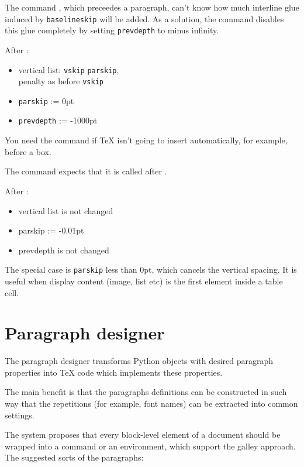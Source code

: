 \documentclass[]{ltugboat}
\begin{document}
The command , which preceedes a paragraph, can't know how much interline glue induced by \verb|baselineskip| will be added. As a solution, the command disables this glue completely by setting \verb|prevdepth| to minus infinity.

\medskip

After :

\begin{itemize}
\item vertical list: \verb|vskip| \verb|parskip|,\\penalty as before \verb|vskip|
\item \verb|parskip| := 0pt
\item \verb|prevdepth| := -1000pt
\end{itemize}

You need the command  if \TeX{} isn't going to insert  automatically, for example, before a box.

The command expects that it is called after .

\medskip

After :

\begin{itemize}
\item vertical list is not changed
\item parskip := -0.01pt
\item prevdepth is not changed
\end{itemize}

The special case is \verb|parskip| less than 0pt, which cancels the vertical spacing. It is useful when display content (image, list etc) is the first element inside a table cell.

\section{Paragraph designer}

The paragraph designer transforms Python objects with desired paragraph properties into \TeX{} code which implements these properties.

The main benefit is that the paragraphs definitions can be constructed in such way that the repetitions (for example, font names) can be extracted into common settings.

The system proposes that every block-level element of a document should be wrapped into a command or an environment, which support the galley approach. The suggested sorts of the paragraphs:
\end{document}
